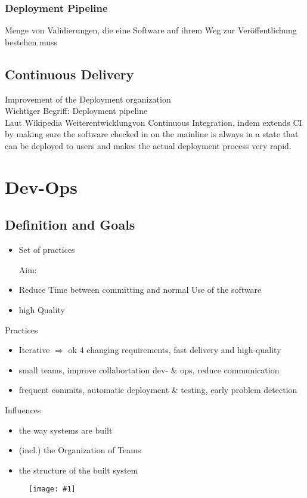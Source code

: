 \documentclass[a4paper,12pt]{article}%
\newcommand{\grafik}[2]{\begin{figure}[!htb]
		\noindent\texttt{[image: \#1]}
		\caption{\textrm{#2}}%
	\end{figure}}
\begin{document}
\subsubsection{Deployment Pipeline}
Menge von Validierungen, die eine Software auf ihrem Weg zur Veröffentlichung bestehen muss
\subsection{Continuous Delivery}
Improvement of the Deployment organization\\
Wichtiger Begriff: Deployment pipeline\\
Laut Wikipedia \glqq Weiterentwicklung\grqq von Continuous Integration, indem extends CI by making sure the software checked in on the mainline is always in a state that can be deployed to users and makes the actual deployment process very rapid.
\newpage
\section{Dev-Ops}
\subsection{Definition and Goals}
\begin{itemize}
	\item Set of practices
	\item [Aim:] 
	\item Reduce Time between committing and normal Use of the software
	\item high Quality
\end{itemize}
Practices
\begin{itemize}
	\item Iterative $\Rightarrow$ ok 4 changing requirements, fast delivery and high-quality
	\item small teams, improve collabortation dev- \& ops, reduce communication 
	\item frequent commits, automatic deployment \& testing, early problem detection
\end{itemize}
Influences
\begin{itemize}
	\item the way systems are built	
	\item (incl.) the Organization of Teams
	\item the structure of the built system
\end{itemize}
\grafik{../zusa2/DevOps/01.png}{}
\end{document}
